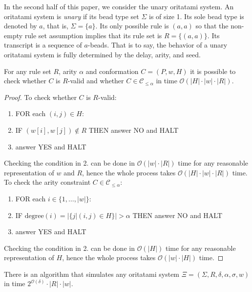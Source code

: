 \documentclass[runningheads]{llncs}
\begin{document}
In the second half of this paper, we consider the unary oritatami system. 
An oritatami system is \textit{unary} if its bead type set $\Sigma$ is of size 1. 
Its sole bead type is denoted by $a$, that is, $\Sigma = \{a\}$. 
Its only possible rule is $(a, a)$ so that the non-empty rule set assumption implies that its rule set is $R = \{(a, a)\}$. 
Its transcript is a sequence of $a$-beads. 
That is to say, the behavior of a unary oritatami system is fully determined by the delay, arity, and seed. 





\begin{proposition}\label{prop:check_validity}
	For any rule set $R$, arity $\alpha$ and conformation $C = (P,w,H)$ it is possible to check whether $C$ is $R$-valid and whether $C\in \mathcal{C}_{\leq \alpha}$ in time $\mathcal{O}(|H|\cdot|w|\cdot|R|)$.
\end{proposition}
\begin{proof}
	To check whether $C$ is $R$-valid:
	\begin{enumerate}
		\item FOR each $(i,j)\in H$:
		\item \hspace{1cm} IF $(w[i],w[j])\notin R$ THEN answer NO and HALT
		\item answer YES and HALT
	\end{enumerate}	
	Checking the condition in 2. can be done in $\mathcal{O}(|w|\cdot|R|)$ time for any reasonable representation of $w$ and $R$, hence the whole process takes $\mathcal{O}(|H|\cdot |w|\cdot|R|)$ time.	
	To check the arity constraint $C\in \mathcal{C}_{\leq \alpha}$: 
	\begin{enumerate}
		\item FOR each $i\in \{1,\dots,|w|\}$:
		\item \hspace{1cm} IF $\mathrm{degree}(i)=|\{j | (i,j)\in H \}|>\alpha$ THEN answer NO and HALT
		\item answer YES and HALT
	\end{enumerate}	
	Checking the condition in 2. can be done in $\mathcal{O}(|H|)$ time for any reasonable representation of $H$, hence the whole process takes $\mathcal{O}(|w|\cdot|H|)$ time.
\end{proof}
\begin{theorem}\label{thm:OS_to_2dTM}
	There is an algorithm that simulates any oritatami system $\Xi = (\Sigma, R, \delta, \alpha, \sigma, w)$ in time $2^{\mathcal{O}(\delta)}\cdot |R|\cdot|w|$. 
\end{theorem}
\end{document}
